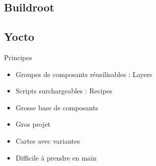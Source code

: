 \subsection{Buildroot}
\begin{frame}
\end{frame}
\subsection{Yocto}
\begin{frame}
	\begin{block}{Principes}
		\begin{itemize}
			\item Groupes de composants réusilisables : Layers
			\item Scripts surchargeables : Recipes
			\item Grosse base de composants
		\end{itemize}
	\end{block}
	\begin{itemize}
		\item Gros projet
		\item Cartes avec variantes
		\item Difficile à prendre en main
	\end{itemize}
\end{frame}

